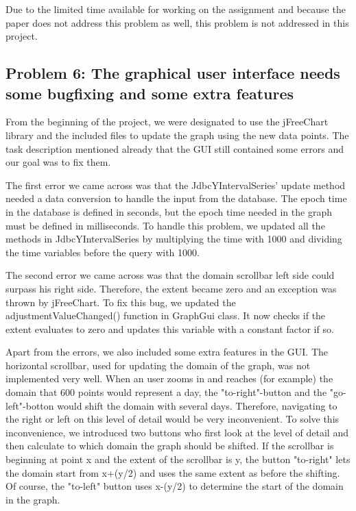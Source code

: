 Due to the limited time available for working on the assignment and because the paper\cite{wombacher2011} does not address this problem as well, this problem is not addressed in this project.

\subsection{Problem 6: The graphical user interface needs some bugfixing and some extra features}
From the beginning of the project, we were designated to use the jFreeChart library and the included files to update the graph using the new data points. The task description mentioned already that the GUI still contained some errors and our goal was to fix them.

The first error we came across was that the JdbcYIntervalSeries' update method needed a data conversion to handle the input from the database. The epoch time in the database is defined in seconds, but the epoch time needed in the graph must be defined in milliseconds. To handle this problem, we updated all the methods in JdbcYIntervalSeries by multiplying the time with 1000 and dividing the time variables before the query with 1000.

The second error we came across was that the domain scrollbar left side could surpass his right side. Therefore, the extent became zero and an exception was thrown by jFreeChart. To fix this bug, we updated the adjustmentValueChanged() function in GraphGui class. It now checks if the extent evaluates to zero and updates this variable with a constant factor if so.

Apart from the errors, we also included some extra features in the GUI. The horizontal scrollbar, used for updating the domain of the graph, was not implemented very well. When an user zooms in and reaches (for example) the domain that 600 points would represent a day, the "to-right"-button and the "go-left"-botton would shift the domain with several days. Therefore, navigating to the right or left on this level of detail would be very inconvenient.
To solve this inconvenience, we introduced two buttons who first look at the level of detail and then calculate to which domain the graph should be shifted. If the scrollbar is beginning at point x and the extent of the scrollbar is y, the button "to-right" lets the domain start from x+(y/2) and uses the same extent as before the shifting. Of course, the "to-left" button uses x-(y/2) to determine the start of the domain in the graph.

